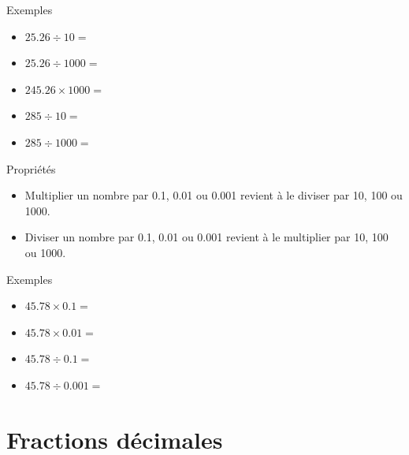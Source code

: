 \documentclass[xcolor={dvipsnames}]{beamer}
\begin{document}
\begin{frame}
	\begin{exampleblock}{Exemples}
		\begin{itemize}
			
				\item $\num{25.26} \div 10 = $%
				\item $\num{25.26} \div 1000 = $%
				\item $\num{245.26} \times 1000 = $%
				\item $\num{285} \div 10 = $%
				\item $\num{285} \div 1000 = $%
		
		\end{itemize}
	\end{exampleblock}
\end{frame}

\begin{frame}
	\begin{alertblock}{Propriétés}
		\begin{itemize}
			\item Multiplier un nombre par \num{0.1}, \num{0.01} ou \num{0.001} revient à le diviser par 10, 100 ou 1000.
			
			\item Diviser un nombre par \num{0.1}, \num{0.01} ou \num{0.001} revient à le multiplier par 10, 100 ou 1000.
		\end{itemize}
	\end{alertblock}
\end{frame}

\begin{frame}
	\begin{exampleblock}{Exemples}
		\begin{itemize}
			\item $\num{45.78} \times \num{0.1} = $%
			\item $\num{45.78} \times \num{0.01} = $%
			\item $\num{45.78} \div \num{0.1} = $%
			\item $\num{45.78} \div \num{0.001} = $%
		\end{itemize}
	\end{exampleblock}
\end{frame}

\section{Fractions décimales}
\end{document}
